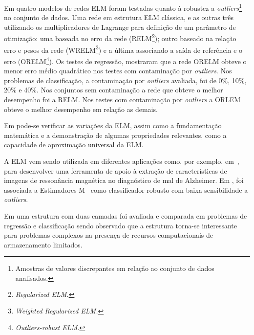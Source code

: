 Em  quatro modelos de redes ELM foram testadas quanto à robustez a \textit{outliers}\footnote{Amostras de valores discrepantes em relação ao conjunto de dados analisados.} no conjunto de dados. Uma rede em estrutura ELM clássica, e as outras três utilizando os multiplicadores de Lagrange para definição de um parâmetro de otimização: uma baseada no erro da rede (RELM\footnote{\textit{Regularized ELM.}}); outro baseado na relação erro e pesos da rede (WRELM\footnote{\textit{Weighted Regularized ELM.}}) e a última associando a saída de referência e o erro (ORELM\footnote{\textit{Outliers-robust ELM.}}). Os testes de regressão, mostraram que a rede ORELM obteve o menor erro médio quadrático nos testes com contaminação por \textit{outliers}. Nos problemas de classificação, a contaminação por \textit{outliers} avaliada, foi de 0\%, 10\%, 20\% e 40\%. Nos conjuntos sem contaminação a rede que obteve o melhor desempenho foi a RELM. Nos testes com contaminação por \textit{outliers} a ORLEM obteve o melhor desempenho em relação as demais.

Em  pode-se verificar as variações da ELM, assim como a fundamentação matemática e a demonstração de algumas propriedades relevantes, como a capacidade de aproximação universal da ELM.

A ELM vem sendo utilizada em diferentes aplicações como, por exemplo, em~, para desenvolver uma ferramenta de apoio à extração de características de imagens de ressonância magnética no diagnóstico de mal de Alzheimer. Em , foi associada a Estimadores-M~\cite{Ruckstuhl2014} como classificador robusto com baixa sensibilidade a \textit{outliers}. 

Em  uma estrutura com duas camadas foi avaliada e comparada em problemas de regressão e classificação sendo observado que a estrutura torna-se interessante para problemas complexos na presença de recursos computacionais de armazenamento limitados.

